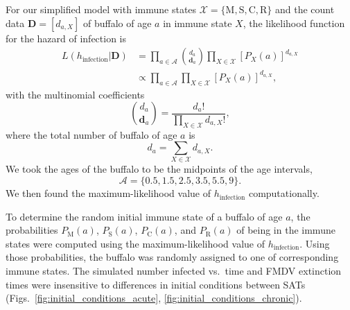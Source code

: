 \documentclass[12pt, USenglish]{article}  %
\renewcommand{\vec}[1]{\mathbf{#1}}
\newcommand{\mat}[1]{\mathbf{#1}}
\begin{document}
For our simplified model with immune states $\mathcal{X} =
\{\mathrm{M}, \mathrm{S}, \mathrm{C}, \mathrm{R}\}$
and the count data
$\mat{D} = \left[d_{a, X}\right]$ of buffalo of age $a$ in immune
state $X$, the likelihood function for the hazard of infection is
\begin{equation}
  \begin{split}
    L\left(h_{\text{infection}} \big| \mat{D}\right)
    &= \prod_{a \in {\mathcal{A}}}
    \binom{d_a}{\vec{d}_a}
    \prod_{X \in \mathcal{X}}
    \left[P_X(a)\right]^{d_{a, X}}
    \\
    &\propto \prod_{a \in {\mathcal{A}}}
    \prod_{X \in \mathcal{X}}
    \left[P_X(a)\right]^{d_{a, X}},
  \end{split}
\end{equation}
with the multinomial coefficients
\begin{equation}
  \binom{d_a}{\vec{d}_a}
  = \frac{d_a!}{\prod\limits_{X \in \mathcal{X}} d_{a, X}!},
\end{equation}
where the total number of buffalo of age $a$ is
\begin{equation}
  d_a = \sum_{X \in \mathcal{X}} d_{a, X}.
\end{equation}
We took the ages of the buffalo to be the midpoints of the age
intervals,
\begin{equation}
  \mathcal{A} = \{0.5, 1.5, 2.5, 3.5, 5.5, 9\}.
\end{equation}
We then found the maximum-likelihood value of $h_{\text{infection}}$
computationally.

To determine the random initial immune state of a buffalo of age $a$,
the probabilities $P_{\mathrm{M}}(a)$, $P_{\mathrm{S}}(a)$,
$P_{\mathrm{C}}(a)$, and $P_{\mathrm{R}}(a)$ of being in the immune
states were computed using the maximum-likelihood value of
$h_{\text{infection}}$. Using those probabilities, the buffalo was
randomly assigned to one of corresponding immune states. The simulated
number infected vs.~time and FMDV extinction times were insensitive to
differences in initial conditions between SATs
(Figs.~\ref{fig:initial_conditions_acute},
\ref{fig:initial_conditions_chronic}).
\end{document}
